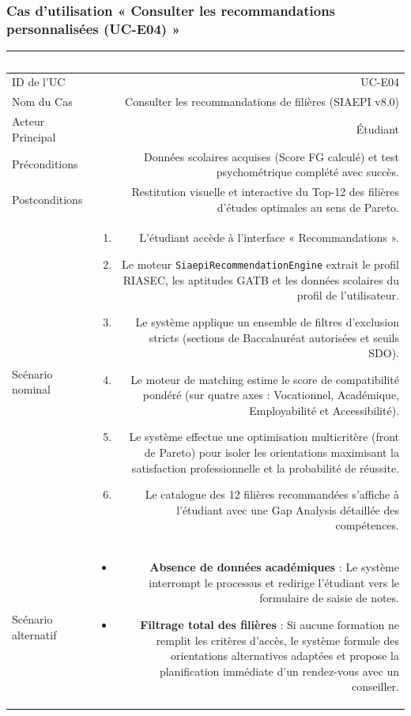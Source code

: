 \vspace{1.5em}

\subsubsection*{Cas d'utilisation « Consulter les recommandations personnalisées (UC-E04) »}

\noindent
\begin{tabular}{|L|R|}
\hline
{}\textcolor{white}{\textbf{Champ}} & \textcolor{white}{\textbf{Description}} \\
\hline
{}ID de l'UC & UC-E04 \\
\hline
Nom du Cas & Consulter les recommandations de filières (SIAEPI v8.0) \\
\hline
{}Acteur Principal & Étudiant \\
\hline
Préconditions & Données scolaires acquises (Score FG calculé) et test psychométrique complété avec succès. \\
\hline
{}Postconditions & Restitution visuelle et interactive du Top-12 des filières d'études optimales au sens de Pareto. \\
\hline
Scénario nominal &
\begin{enumerate}
  \item L'étudiant accède à l'interface « Recommandations ».
  \item Le moteur \texttt{SiaepiRecommendationEngine} extrait le profil RIASEC, les aptitudes GATB et les données scolaires du profil de l'utilisateur.
  \item Le système applique un ensemble de filtres d'exclusion stricts (sections de Baccalauréat autorisées et seuils SDO).
  \item Le moteur de matching estime le score de compatibilité pondéré (sur quatre axes : Vocationnel, Académique, Employabilité et Accessibilité).
  \item Le système effectue une optimisation multicritère (front de Pareto) pour isoler les orientations maximisant la satisfaction professionnelle et la probabilité de réussite.
  \item Le catalogue des 12 filières recommandées s'affiche à l'étudiant avec une Gap Analysis détaillée des compétences.
\end{enumerate} \\
\hline
{}Scénario alternatif &
\begin{itemize}
  \item \textbf{Absence de données académiques} : Le système interrompt le processus et redirige l'étudiant vers le formulaire de saisie de notes.
  \item \textbf{Filtrage total des filières} : Si aucune formation ne remplit les critères d'accès, le système formule des orientations alternatives adaptées et propose la planification immédiate d'un rendez-vous avec un conseiller.
\end{itemize} \\
\hline
\end{tabular}


